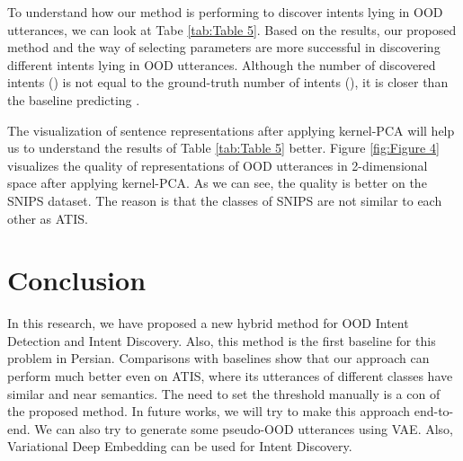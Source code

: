 \documentclass{article}
\begin{document}
To understand how our method is performing to discover intents lying in OOD utterances, we can look at Tabe \ref{tab:Table 5}.
Based on the results, our proposed method and the way of selecting parameters are more successful in discovering different intents lying in OOD utterances.
Although the number of discovered intents () is not equal to the ground-truth number of intents (), it is closer than the baseline predicting .

The visualization of sentence representations after applying kernel-PCA will help us to understand the results of Table \ref{tab:Table 5} better.
Figure \ref{fig:Figure 4} visualizes the quality of representations of OOD utterances in 2-dimensional space after applying kernel-PCA.
As we can see, the quality is better on the SNIPS dataset. The reason is that the classes of SNIPS are not similar to each other as ATIS.

\section{Conclusion}\label{conclustion}

In this research, we have proposed a new hybrid method for OOD Intent Detection and Intent Discovery.
Also, this method is the first baseline for this problem in Persian.
Comparisons with baselines show that our approach can perform much better even on ATIS, where its utterances of different classes have similar and near semantics.
The need to set the threshold manually is a con of the proposed method.
In future works, we will try to make this approach end-to-end.
We can also try to generate some pseudo-OOD utterances using VAE.
Also, Variational Deep Embedding can be used for Intent Discovery.



  
\end{document}
